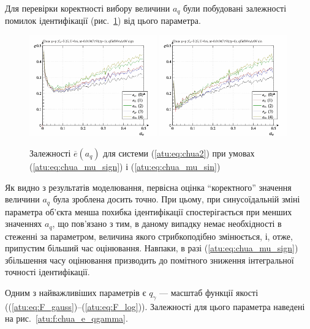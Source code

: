 Для перевірки коректності вибору величини
$ a_q $ були побудовані залежності помилок ідентифікації
(рис.~\ref{atu:f:chua_e_a_q}) від цього параметра.


\begin{figure}[htb!]
  \centerline{
    \includegraphics[width=0.49\textwidth]{p/cha/chua/ql3rlWvnAAW/chua_id-p_a_q_sign.png}
    \hfill
    \includegraphics[width=0.49\textwidth]{p/cha/chua/ql3rlWvnAAW/chua_id-p_a_q_sin.png}
  }
\caption{Залежності $ \overline{e} (a_q) $ для системи (\ref{atu:eq:chua2}) при умовах (\ref{atu:eq:chua_mu_sign}) і (\ref{atu:eq:chua_mu_sin})
}
\label{atu:f:chua_e_a_q}
\end{figure}

Як видно з результатів моделювання, первісна оцінка ``коректного'' значення величини
$a_q$ була зроблена досить точно. При цьому, при синусоїдальній
зміні параметра об'єкта менша похибка ідентифікації
спостерігається при менших значеннях
$ a_q $, що пов'язано з тим, в даному випадку немає необхідності в
стеженні за параметром, величина якого стрибкоподібно змінюється,
і, отже, припустим більший час оцінювання. Навпаки, в разі
(\ref{atu:eq:chua_mu_sign}) збільшення часу оцінювання призводить до
помітного зниження інтегральної точності ідентифікації.


Одним з найважливіших параметрів є
$ q_\gamma $ --- масштаб функції якості
((\ref{atu:eq:F_gauss})--(\ref{atu:eq:F_log})).
Залежності для цього параметра наведені на рис.~\ref{atu:f:chua_e_qgamma}.

